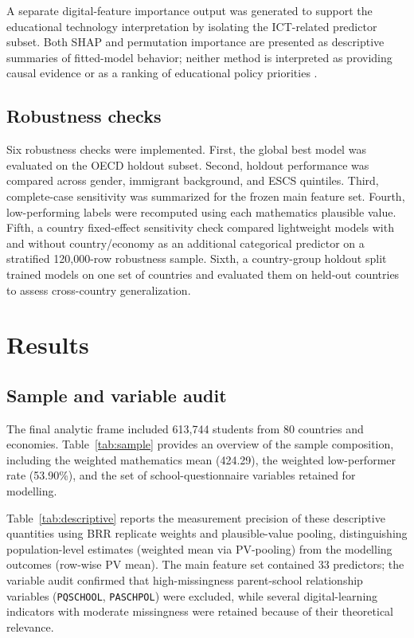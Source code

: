 \documentclass[pdflatex,sn-mathphys-ay]{sn-jnl}
\begin{document}
A separate digital-feature importance output was generated to support the educational technology interpretation by isolating the ICT-related predictor subset. Both SHAP and permutation importance are presented as descriptive summaries of fitted-model behavior; neither method is interpreted as providing causal evidence or as a ranking of educational policy priorities \citep{Molnar_2022,Meylani_2025_xai_tripartite}.

\FloatBarrier
\subsection{Robustness checks}

Six robustness checks were implemented. First, the global best model was evaluated on the OECD holdout subset. Second, holdout performance was compared across gender, immigrant background, and ESCS quintiles. Third, complete-case sensitivity was summarized for the frozen main feature set. Fourth, low-performing labels were recomputed using each mathematics plausible value. Fifth, a country fixed-effect sensitivity check compared lightweight models with and without country/economy as an additional categorical predictor on a stratified 120,000-row robustness sample. Sixth, a country-group holdout split trained models on one set of countries and evaluated them on held-out countries to assess cross-country generalization.

\FloatBarrier
\section{Results}

\FloatBarrier
\subsection{Sample and variable audit}

The final analytic frame included 613,744 students from 80 countries and economies. Table~\ref{tab:sample} provides an overview of the sample composition, including the weighted mathematics mean (424.29), the weighted low-performer rate (53.90\%), and the set of school-questionnaire variables retained for modelling.



Table~\ref{tab:descriptive} reports the measurement precision of these descriptive quantities using BRR replicate weights and plausible-value pooling, distinguishing population-level estimates (weighted mean via PV-pooling) from the modelling outcomes (row-wise PV mean). The main feature set contained 33 predictors; the variable audit confirmed that high-missingness parent-school relationship variables (\texttt{PQSCHOOL}, \texttt{PASCHPOL}) were excluded, while several digital-learning indicators with moderate missingness were retained because of their theoretical relevance.
\end{document}
